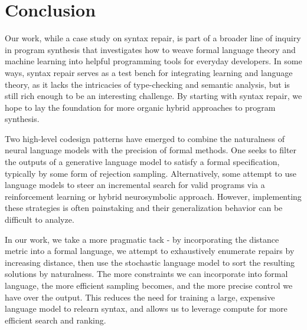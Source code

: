 \documentclass[runningheads]{llncs}
\begin{document}
  \section{Conclusion}\label{sec:conclusion}

  Our work, while a case study on syntax repair, is part of a broader line of inquiry in program synthesis that investigates how to weave formal language theory and machine learning into helpful programming tools for everyday developers. In some ways, syntax repair serves as a test bench for integrating learning and language theory, as it lacks the intricacies of type-checking and semantic analysis, but is still rich enough to be an interesting challenge. By starting with syntax repair, we hope to lay the foundation for more organic hybrid approaches to program synthesis.

  Two high-level codesign patterns have emerged to combine the naturalness of neural language models with the precision of formal methods. One seeks to filter the outputs of a generative language model to satisfy a formal specification, typically by some form of rejection sampling. Alternatively, some attempt to use language models to steer an incremental search for valid programs via a reinforcement learning or hybrid neurosymbolic approach. However, implementing these strategies is often painstaking and their generalization behavior can be difficult to analyze.

  In our work, we take a more pragmatic tack - by incorporating the distance metric into a formal language, we attempt to exhaustively enumerate repairs by increasing distance, then use the stochastic language model to sort the resulting solutions by naturalness. The more constraints we can incorporate into formal language, the more efficient sampling becomes, and the more precise control we have over the output. This reduces the need for training a large, expensive language model to relearn syntax, and allows us to leverage compute for more efficient search and ranking.

\end{document}
